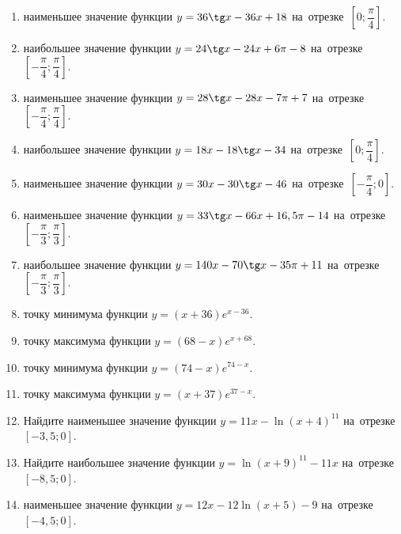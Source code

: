 \documentclass[a4paper,10pt]{article}
\begin{document}
\begin{enumerate}
\item {} наименьшее значение функции $y = 36\tg x-36x+18$ на~отрезке~$\left[0;\dfrac{\pi }{4}\right]$.

\item {} наибольшее значение функции $y=24\tg x-24x+6\pi -8$ на~отрезке~$\left[-\dfrac{\pi }{4};\dfrac{\pi }{4}\right]$.

\item {} наименьшее значение функции $y=28\tg x-28x-7\pi +7$ на~отрезке~$\left[-\dfrac{\pi }{4};\dfrac{\pi }{4}\right]$.

\item {} наибольшее значение функции $y = 18x-18\tg x -34$ на~отрезке~$\left[0;\dfrac{\pi }{4}\right]$.

\item {} наименьшее значение функции $y = 30x-30\tg x -46$ на~отрезке~$\left[-\dfrac{\pi }{4};0\right]$.

\item {} наименьшее значение функции $y = 33\tg x-66x+16,5 \pi -14$ на~отрезке~$\left[-\dfrac{\pi }{3};\dfrac{\pi }{3}\right]$.

\item {} наибольшее значение функции $y = 140x-70\tg x-35\pi +11$ на~отрезке~$\left[-\dfrac{\pi }{3};\dfrac{\pi }{3}\right]$.

\item {} точку минимума функции $y = \left(x+36\right)e^{x-36}$.

\item {} точку максимума функции $y = \left(68-x\right)e^{x+68}$.

\item {} точку минимума функции $y = \left(74-x\right)e^{74-x}$.

\item {} точку максимума функции $y = \left(x+37\right)e^{37-x}$.

\item Найдите наименьшее значение функции $y = 11x-\ln \left(x+4\right)^{11}$ на~отрезке~$\left[-3,5;0\right]$.

\item Найдите наибольшее значение функции $y = \ln \left(x+9\right)^{11}-11x$ на~отрезке~$\left[-8,5;0\right]$.

\item {} наименьшее значение функции $y = 12x-12\ln \left(x+5\right) -9$ на~отрезке~$\left[-4,5;0\right]$.


\end{enumerate}
\end{document}
